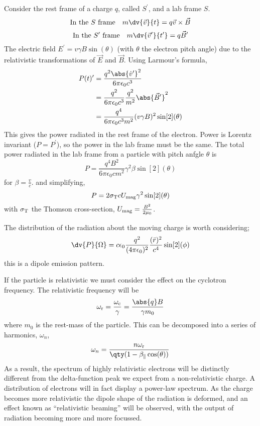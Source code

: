 \documentclass{book}         		                %
\begin{document}
Consider the rest frame of a charge $q$, called $S^{\prime}$, and a
lab frame $S$. 
\[ \text{In the $S$ frame} \quad m \dv{\vec{v}}{t} = q \vec{v} \times \vec{B} \]
\[ \text{In the $S^{\prime}$ frame} \quad m
\dv{\vec{v}^{\prime}}{t^{\prime}} = q \vec{B}^{\prime} \] The electric
field $E^{\prime} = v \gamma B \sin(\theta)$ (with $\theta$ the
electron pitch angle) due to the relativistic transformations of
$\vec{E}$ and $\vec{B}$.
Using Larmour's formula,
\begin{align*}
  P(t)^{\prime} &= \frac{q^2 \abs{\dot{v}^{\prime}}^2}{6 \pi
    \epsilon_0 c^3}\\ &= \frac{q^2}{6 \pi \epsilon_0 c^3}
  \frac{q^2}{m^2} \abs{\vec{B}^{\prime}}^2 \\ &= \frac{q^4}{6 \pi
    \epsilon_0 c^3 m^2} (v \gamma B)^2 \sin[2](\theta)
\end{align*}
This gives the power radiated in the rest frame of the electron. Power
is Lorentz invariant ($P = P^{\prime}$), so the power in the lab frame
must be the same. The total power radiated in the lab frame from a
particle with pitch anfgle $\theta$ is
\[ P = \frac{q^4 B^2}{6 \pi \epsilon_0 c m^2} \gamma^2 \beta
\sin[2](\theta) \] for $\beta = \frac{v}{c}$.
and simplifying,
\[ P = 2 \sigma_{\rm T} c U_{\rm mag} \gamma^2 \sin[2](\theta) \] with
$\sigma_{\rm T}$ the Thomson cross-section, $U_{\rm mag} =
\frac{B^2}{2 \mu_0}$.

The distribution of the radiation about the moving charge is worth
considering;
\begin{equation}
  \label{eq:12}
  \dv{P}{\Omega} = c \epsilon_0 \frac{q^2}{(4 \pi \epsilon_0)^2} \frac{(\ddot{r})^2}{c^4} \sin[2](\phi)
\end{equation}
this is a dipole emission pattern.

If the particle is relativistic we must consider the effect on the
cyclotron frequency. The relativistic frequency will be
\[ \omega_{\rm r} = \frac{\omega_{\rm c}}{\gamma} =
\frac{\abs{q}B}{\gamma m_0} \] where $m_0$ is the rest-mass of the
particle. This can be decomposed into a series of harmonics,
$\omega_n$,
\[ \omega_n = \frac{n \omega_{\rm r}}{\qty(1 - \beta_{\parallel}
  \cos(\theta) )} \] As a result, the spectrum of highly relativistic
electrons will be distinctly different from the delta-function peak we
expect from a non-relativistic charge. A distribution of electrons
will in fact display a power-law spectrum. As the charge becomes more
relativistic the dipole shape of the radiation is deformed, and an
effect known as ``relativistic beaming'' will be observed, with the
output of radiation becoming more and more focussed.
\end{document}
